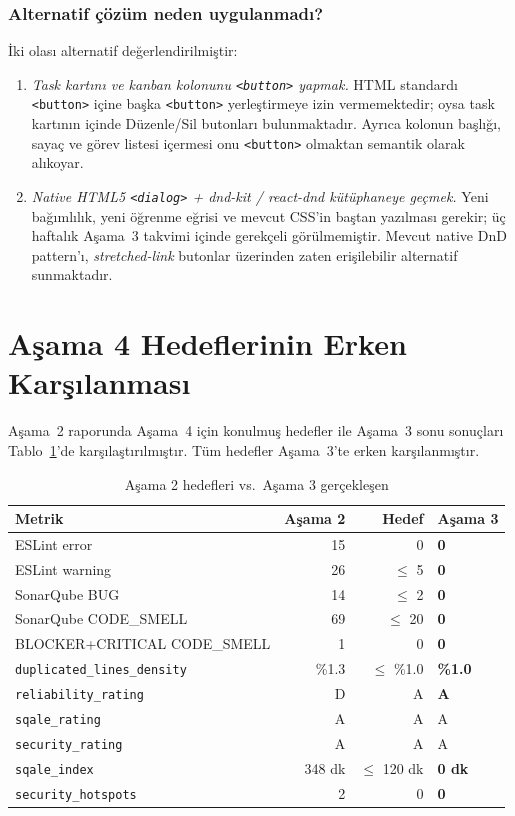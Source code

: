 \documentclass[conference]{IEEEtran}
\begin{document}
\subsubsection{Alternatif çözüm neden uygulanmadı?}
İki olası alternatif değerlendirilmiştir:
\begin{enumerate}
\item \emph{Task kartını ve kanban kolonunu \texttt{<button>} yapmak.}
  HTML standardı \texttt{<button>} içine başka \texttt{<button>}
  yerleştirmeye izin vermemektedir; oysa task kartının içinde Düzenle/Sil
  butonları bulunmaktadır. Ayrıca kolonun başlığı, sayaç ve görev listesi
  içermesi onu \texttt{<button>} olmaktan semantik olarak alıkoyar.
\item \emph{Native HTML5 \texttt{<dialog>} + dnd-kit / react-dnd
  kütüphaneye geçmek.} Yeni bağımlılık, yeni öğrenme eğrisi ve mevcut
  CSS'in baştan yazılması gerekir; üç haftalık Aşama~3 takvimi içinde
  gerekçeli görülmemiştir. Mevcut native DnD pattern'ı, \emph{stretched-link}
  butonlar üzerinden zaten erişilebilir alternatif sunmaktadır.
\end{enumerate}

\section{Aşama 4 Hedeflerinin Erken Karşılanması}
\label{sec:hedef}

Aşama~2 raporunda Aşama~4 için konulmuş hedefler ile Aşama~3 sonu
sonuçları Tablo~\ref{tab:hedefler}'de karşılaştırılmıştır. Tüm hedefler
Aşama~3'te erken karşılanmıştır.

\begin{table}[htbp]
\caption{Aşama 2 hedefleri vs.\ Aşama 3 gerçekleşen}
\label{tab:hedefler}
\centering
\begin{tabular}{@{}lrrl@{}}
\toprule
\textbf{Metrik} & \textbf{Aşama 2} & \textbf{Hedef} & \textbf{Aşama 3} \\
\midrule
ESLint error             & 15 & 0 & \textbf{0} \\
ESLint warning           & 26 & $\leq$ 5 & \textbf{0} \\
SonarQube BUG            & 14 & $\leq$ 2 & \textbf{0} \\
SonarQube CODE\_SMELL    & 69 & $\leq$ 20 & \textbf{0} \\
BLOCKER+CRITICAL CODE\_SMELL & 1 & 0 & \textbf{0} \\
\texttt{duplicated\_lines\_density} & \%1.3 & $\leq$ \%1.0 & \textbf{\%1.0} \\
\texttt{reliability\_rating} & D & A & \textbf{A} \\
\texttt{sqale\_rating}   & A & A & A \\
\texttt{security\_rating} & A & A & A \\
\texttt{sqale\_index}    & 348 dk & $\leq$ 120 dk & \textbf{0 dk} \\
\texttt{security\_hotspots} & 2 & 0 & \textbf{0} \\
\bottomrule
\end{tabular}
\end{table}
\end{document}
